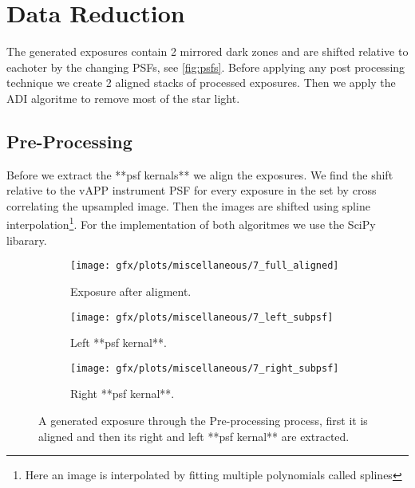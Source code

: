 
\chapter{Data Reduction} %
\label{ch:data_red} %
The generated exposures contain 2 mirrored dark zones and are shifted relative to eachoter by the changing \acp{PSF}, see \autoref{fig:psfs}. Before applying any post processing technique we create 2 aligned stacks of processed exposures. Then we apply the \ac{ADI} algoritme to remove most of the star light.

\section{Pre-Processing}
Before we extract the **psf kernals** we align the exposures. We find the shift relative to the \ac{vAPP} instrument \ac{PSF} for every exposure in the set by cross correlating the upsampled image. Then the images are shifted using spline interpolation\footnote{Here an image is interpolated by fitting multiple polynomials called splines}. For the implementation of both algoritmes we use the SciPy libarary\cite{scipy}.

\begin{figure}[h!]
  
      \begin{subfigure}[b]{0.5\textwidth}
        \texttt{[image: gfx/plots/miscellaneous/7\_full\_aligned]}
        \caption{Exposure after aligment.}
      \end{subfigure}%
      
      \begin{subfigure}[b]{0.5\textwidth}
        \texttt{[image: gfx/plots/miscellaneous/7\_left\_subpsf]}
        \caption{Left **psf kernal**.}
        \label{fig:slice_a}
      \end{subfigure}      
      \begin{subfigure}[b]{0.5\textwidth}
        \texttt{[image: gfx/plots/miscellaneous/7\_right\_subpsf]}
        \caption{Right **psf kernal**.}
        \label{fig:slice_b}
      \end{subfigure}%

  \caption{A generated exposure through the Pre-processing process, first it is aligned and then its right and left **psf kernal** are extracted.}
  \label{fig:psfs_evolving}
\end{figure}

